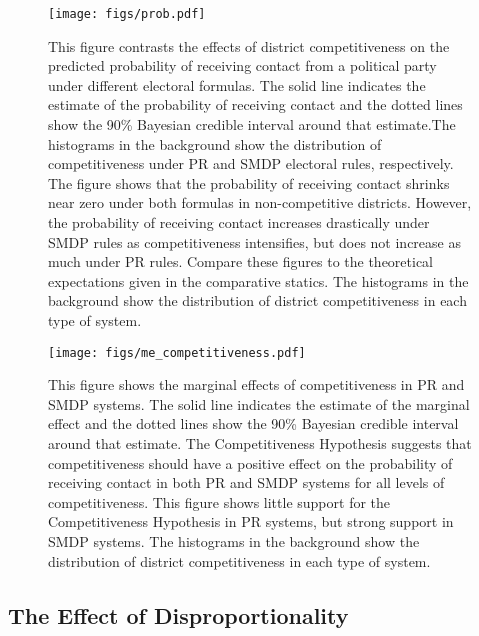 \documentclass[12pt]{article}
\begin{document}
\begin{figure}[h]
\centering
\texttt{[image: figs/prob.pdf]}
\caption{This figure contrasts the effects of district competitiveness on the predicted probability of receiving contact from a political party under different electoral formulas. The solid line indicates the estimate of the probability of receiving contact and the dotted lines show the 90\% Bayesian credible interval around that estimate.The histograms in the background show the distribution of competitiveness under PR and SMDP electoral rules, respectively. The figure shows that the probability of receiving contact shrinks near zero under both formulas in non-competitive districts. However, the probability of receiving contact increases drastically under SMDP rules as competitiveness intensifies, but does not increase as much under PR rules. Compare these figures to the theoretical expectations given in the comparative statics. The histograms in the background show the distribution of district competitiveness in each type of system.}\label{FullPrProb}
\end{figure}

\begin{figure}[h]
\centering
\texttt{[image: figs/me\_competitiveness.pdf]}
\caption{This figure shows the marginal effects of competitiveness in PR and SMDP systems. The solid line indicates the estimate of the marginal effect and the dotted lines show the 90\% Bayesian credible interval around that estimate. The Competitiveness Hypothesis suggests that competitiveness should have a positive effect on the probability of receiving contact in both PR and SMDP systems for all levels of competitiveness. This figure shows little support for the Competitiveness Hypothesis in PR systems, but strong support in SMDP systems. The histograms in the background show the distribution of district competitiveness in each type of system.}\label{mfx}
\end{figure}
\newpage

\subsection*{The Effect of Disproportionality}
\end{document}
